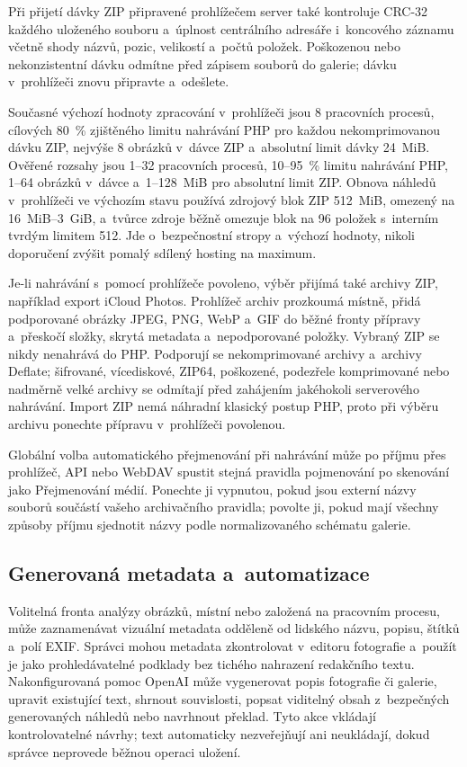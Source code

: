 \documentclass[11pt,a4paper]{article}
\begin{document}
Při přijetí dávky ZIP připravené prohlížečem server také kontroluje CRC-32
každého uloženého souboru a~úplnost centrálního adresáře i~koncového záznamu
včetně shody názvů, pozic, velikostí a~počtů položek. Poškozenou nebo
nekonzistentní dávku odmítne před zápisem souborů do galerie; dávku v~prohlížeči
znovu připravte a~odešlete.

Současné výchozí hodnoty zpracování v~prohlížeči jsou 8 pracovních procesů,
cílových 80~\% zjištěného limitu nahrávání PHP pro každou nekomprimovanou dávku
ZIP, nejvýše 8 obrázků v~dávce ZIP a~absolutní limit dávky 24~MiB. Ověřené
rozsahy jsou 1--32 pracovních procesů, 10--95~\% limitu nahrávání PHP, 1--64
obrázků v~dávce a~1--128~MiB pro absolutní limit ZIP. Obnova náhledů
v~prohlížeči ve výchozím stavu používá zdrojový blok ZIP 512~MiB, omezený na
16~MiB--3~GiB, a~tvůrce zdroje běžně omezuje blok na 96 položek s~interním
tvrdým limitem 512. Jde o~bezpečnostní stropy a~výchozí hodnoty, nikoli
doporučení zvýšit pomalý sdílený hosting na maximum.

Je-li nahrávání s~pomocí prohlížeče povoleno, výběr přijímá také archivy ZIP,
například export iCloud Photos. Prohlížeč archiv prozkoumá místně, přidá
podporované obrázky JPEG, PNG, WebP a~GIF do běžné fronty přípravy a~přeskočí
složky, skrytá metadata a~nepodporované položky. Vybraný ZIP se nikdy nenahrává
do PHP. Podporují se nekomprimované archivy a~archivy Deflate; šifrované,
vícediskové, ZIP64, poškozené, podezřele komprimované nebo nadměrně velké
archivy se odmítají před zahájením jakéhokoli serverového nahrávání. Import ZIP
nemá náhradní klasický postup PHP, proto při výběru archivu ponechte přípravu
v~prohlížeči povolenou.

Globální volba automatického přejmenování při nahrávání může po příjmu přes
prohlížeč, API nebo WebDAV spustit stejná pravidla pojmenování po skenování jako
Přejmenování médií. Ponechte ji vypnutou, pokud jsou externí názvy souborů
součástí vašeho archivačního pravidla; povolte ji, pokud mají všechny způsoby
příjmu sjednotit názvy podle normalizovaného schématu galerie.
\subsection{Generovaná metadata a~automatizace}

Volitelná fronta analýzy obrázků, místní nebo založená na pracovním procesu,
může zaznamenávat vizuální metadata odděleně od lidského názvu, popisu, štítků
a~polí EXIF. Správci mohou metadata zkontrolovat v~editoru fotografie a~použít
je jako prohledávatelné podklady bez tichého nahrazení redakčního textu.
Nakonfigurovaná pomoc OpenAI může vygenerovat popis fotografie či galerie,
upravit existující text, shrnout souvislosti, popsat viditelný obsah
z~bezpečných generovaných náhledů nebo navrhnout překlad. Tyto akce vkládají
kontrolovatelné návrhy; text automaticky nezveřejňují ani neukládají, dokud
správce neprovede běžnou operaci uložení.
\end{document}
